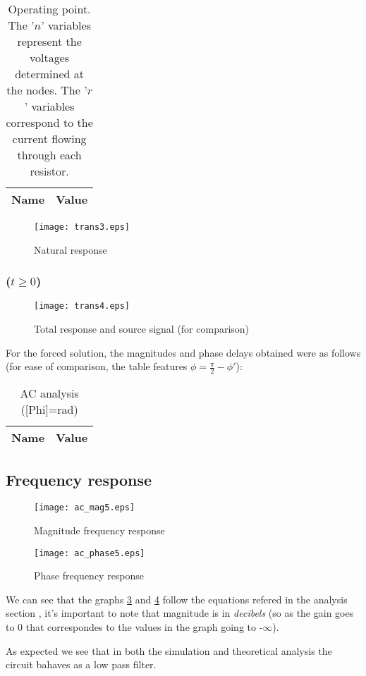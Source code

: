 \begin{table}[H]
	\centering
	\begin{tabular}{|l|c|}
		\hline    
		    {\bf Name} & {\bf Value} \\
                    \hline
                    \hline
		
	\end{tabular}
	\caption{Operating point. The '$n$' variables represent the voltages determined at the nodes. The '$r$' variables correspond to the current flowing through each resistor.}
	\label{tab:op2}
\end{table}

\begin{figure}[H]
  \centering
  \texttt{[image: trans3.eps]}
  \caption{Natural response}
  \label{fig:nat_sim}
\end{figure}

\subsubsection{($ t \geq 0$)}

\begin{figure}[H]
  \centering
  \texttt{[image: trans4.eps]}
  \caption{Total response and source signal (for comparison)}
  \label{fig:tot:sim}
\end{figure}

For the forced solution, the magnitudes and phase delays obtained were as follows (for ease of comparison, the table features $\phi = \frac{\pi}{2} - \phi'$):

\begin{table}[H]
	\centering
	\begin{tabular}{|l|c|}
		\hline    
		    {\bf Name} & {\bf Value} \\
                    \hline
                    \hline
		
	\end{tabular}
	\caption{AC analysis ([Phi]=rad)}
	\label{tab:op1}
\end{table}

\subsection{Frequency response}

\begin{figure}[H]
  \centering
  \texttt{[image: ac\_mag5.eps]}
  \caption{Magnitude frequency response}
  \label{freq_resp_mag_sim}
\end{figure}

\begin{figure}[H]
  \centering
  \texttt{[image: ac\_phase5.eps]}
  \caption{Phase frequency response}
  \label{freq_resp_pha_sim}
\end{figure}

We can see that the graphs \ref{freq_resp_mag_sim} and \ref{freq_resp_pha_sim} follow the equations refered in the analysis section , it's important to note that magnitude is in \emph{decibels} (so as the gain goes to 0 that correspondes to the values in the graph going to -$\infty$).

As expected we see that in both the simulation and theoretical analysis the circuit bahaves as a low pass filter.	
